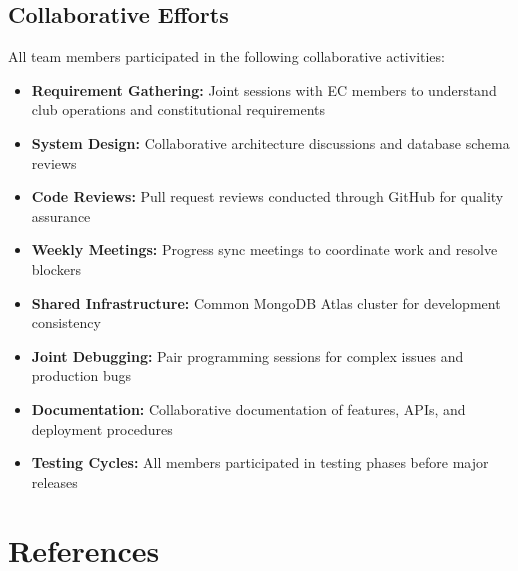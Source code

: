 \documentclass[12pt,a4paper]{article}
\begin{document}
\subsection*{Collaborative Efforts}

All team members participated in the following collaborative activities:

\begin{itemize}[noitemsep]
  \item \textbf{Requirement Gathering:} Joint sessions with EC members to understand club operations and constitutional requirements
  \item \textbf{System Design:} Collaborative architecture discussions and database schema reviews
  \item \textbf{Code Reviews:} Pull request reviews conducted through GitHub for quality assurance
  \item \textbf{Weekly Meetings:} Progress sync meetings to coordinate work and resolve blockers
  \item \textbf{Shared Infrastructure:} Common MongoDB Atlas cluster for development consistency
  \item \textbf{Joint Debugging:} Pair programming sessions for complex issues and production bugs
  \item \textbf{Documentation:} Collaborative documentation of features, APIs, and deployment procedures
  \item \textbf{Testing Cycles:} All members participated in testing phases before major releases
\end{itemize}

\section*{References}
\end{document}
